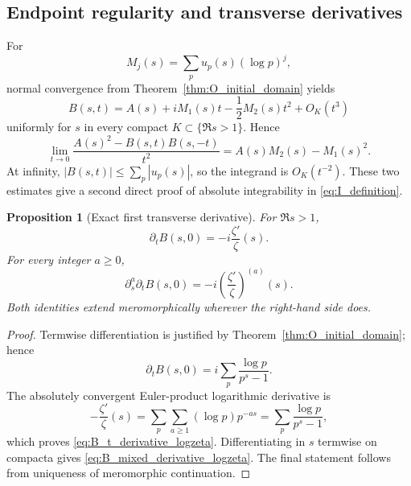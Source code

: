 \documentclass[11pt]{amsart}
\numberwithin{equation}{section}
\theoremstyle{plain}
\newtheorem{proposition}[theorem]{Proposition}
\theoremstyle{definition}
\theoremstyle{remark}
\begin{document}
\subsection{Endpoint regularity and transverse derivatives}
\label{subsec:I_endpoint}

For
\begin{equation}
M_j(s)=\sum_pu_p(s)(\log p)^j,
\label{eq:Mj_u_weights}
\end{equation}
normal convergence from Theorem~\ref{thm:O_initial_domain} yields
\begin{equation}
B(s,t)=A(s)+iM_1(s)t-\frac12M_2(s)t^2+O_K(t^3)
\label{eq:B_taylor_t}
\end{equation}
uniformly for \(s\) in every compact \(K\subset\{\Re s>1\}\).  Hence
\begin{equation}
\lim_{t\to0}
\frac{A(s)^2-B(s,t)B(s,-t)}{t^2}
=
A(s)M_2(s)-M_1(s)^2.
\label{eq:t0_removable}
\end{equation}
At infinity, \(|B(s,t)|\le\sum_p|u_p(s)|\), so the integrand is
\(O_K(t^{-2})\).  These two estimates give a second direct proof of absolute
integrability in \eqref{eq:I_definition}.

\begin{proposition}[Exact first transverse derivative]
\label{prop:B_first_transverse}
For \(\Re s>1\),
\begin{equation}
\boxed{
\partial_tB(s,0)=-i\frac{\zeta'}{\zeta}(s).}
\label{eq:B_t_derivative_logzeta}
\end{equation}
For every integer \(a\ge0\),
\begin{equation}
\boxed{
\partial_s^a\partial_tB(s,0)
=-i\left(\frac{\zeta'}{\zeta}\right)^{(a)}(s).}
\label{eq:B_mixed_derivative_logzeta}
\end{equation}
Both identities extend meromorphically wherever the right-hand side does.
\end{proposition}

\begin{proof}
Termwise differentiation is justified by
Theorem~\ref{thm:O_initial_domain}; hence
\begin{equation}
\partial_tB(s,0)
=i\sum_p\frac{\log p}{p^s-1}.
\label{eq:B_t_prime_sum}
\end{equation}
The absolutely convergent Euler-product logarithmic derivative is
\begin{equation}
-\frac{\zeta'}{\zeta}(s)
=\sum_p\sum_{a\ge1}(\log p)p^{-as}
=\sum_p\frac{\log p}{p^s-1},
\label{eq:logderivative_prime_sum}
\end{equation}
which proves \eqref{eq:B_t_derivative_logzeta}.  Differentiating in \(s\)
termwise on compacta gives \eqref{eq:B_mixed_derivative_logzeta}.  The final
statement follows from uniqueness of meromorphic continuation.
\end{proof}
\end{document}
